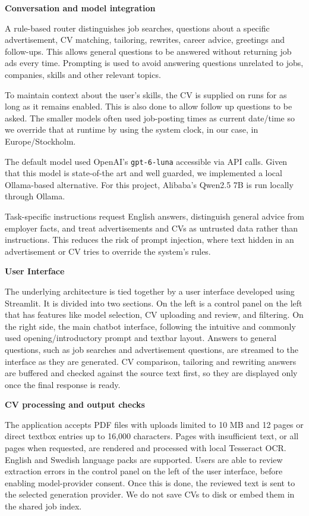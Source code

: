 \documentclass[a4paper,10pt]{article}
\begin{document}
\textbf{Conversation and model integration} 

A rule-based router distinguishes job searches, questions about a specific advertisement, CV matching, tailoring, rewrites, career advice, greetings and follow-ups. This allows general questions to be answered without returning job ads every time. Prompting is used to avoid answering questions unrelated to jobs, companies, skills and other relevant topics. 

To maintain context about the user's skills, the CV is supplied on runs for as long as it remains enabled. This is also done to allow follow up questions to be asked. The smaller models often used job-posting times as current date/time so we override that at runtime by using the system clock, in our case, in Europe/Stockholm. 


The default model used OpenAI's  \texttt{gpt-6-luna} accessible via API calls. Given that this model is state-of-the art and well guarded, we implemented a local Ollama-based alternative. For this project, Alibaba's Qwen2.5 7B is run locally through Ollama. 


Task-specific instructions request English answers, distinguish general advice from employer facts, and treat advertisements and CVs as untrusted data rather than instructions. This reduces the risk of prompt injection, where text hidden in an advertisement or CV tries to override the system's rules.


\textbf{User Interface}

The underlying architecture is tied together by a user interface developed using Streamlit. It is divided into two sections. On the left is a control panel on the left that has features like model selection, CV uploading and review, and filtering. On the right side, the main chatbot interface, following the intuitive and commonly used opening/introductory prompt and textbar layout. Answers to general questions, such as job searches and advertisement questions, are streamed to the interface as they are generated. CV comparison, tailoring and rewriting answers are buffered and checked against the source text first, so they are displayed only once the final response is ready.


\textbf{CV processing and output checks} 

The application accepts PDF files with uploads limited to 10 MB and 12 pages or direct textbox entries up to 16,000 characters. Pages with insufficient text, or all pages when requested, are rendered and processed with local Tesseract OCR. English and Swedish language packs are supported. Users are able to review extraction errors in the control panel on the left of the user interface, before enabling model-provider consent. Once this is done, the reviewed text is sent to the selected generation provider. We do not save CVs to disk or embed them in the shared job index.
\end{document}
